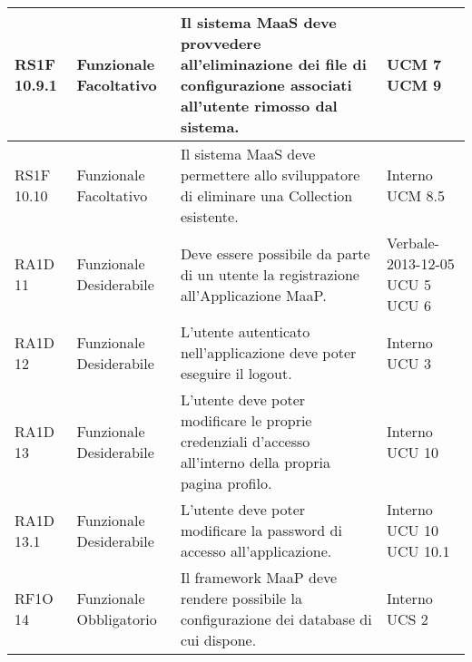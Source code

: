 \begin{center}
\begin{longtable}{ | l | p{2cm} | p{5cm} | p{1.7cm} |}
        RS1F 10.9.1 & Funzionale \newline  Facoltativo  & Il sistema MaaS deve provvedere all’eliminazione dei file di configurazione associati all’utente rimosso dal sistema. &  UCM 7 \newline  UCM 9 \newline  \\ \hline      
        RS1F 10.10 & Funzionale \newline  Facoltativo  & Il sistema MaaS deve permettere allo sviluppatore di eliminare una Collection esistente. &  Interno \newline  UCM 8.5 \newline  \\ \hline      
        RA1D 11 & Funzionale \newline  Desiderabile  & Deve essere possibile da parte di un utente la registrazione all’Applicazione MaaP. &  Verbale-2013-12-05 \newline  UCU 5 \newline  UCU 6 \newline  \\ \hline      
        RA1D 12 & Funzionale \newline  Desiderabile  & L’utente autenticato nell’applicazione deve poter eseguire il logout. &  Interno \newline  UCU 3 \newline  \\ \hline      
        RA1D 13 & Funzionale \newline  Desiderabile  & L'utente deve poter modificare le proprie credenziali d'accesso all'interno della propria pagina profilo. &  Interno \newline  UCU 10 \newline  \\ \hline      
        RA1D 13.1 & Funzionale \newline  Desiderabile  & L’utente deve poter modificare la password di accesso all’applicazione. &  Interno \newline  UCU 10 \newline  UCU 10.1 \newline  \\ \hline      
        RF1O 14 & Funzionale \newline  Obbligatorio  & Il framework MaaP deve rendere possibile la configurazione dei database di cui dispone. &  Interno \newline  UCS 2 \newline  \\ \hline      

\end{longtable}
\end{center}

